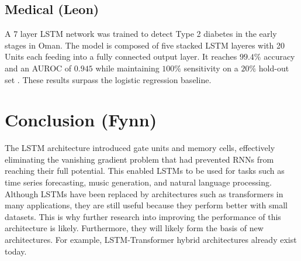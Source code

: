 \documentclass[twoside,a4paper,10pt,DIV=12,BCOR=12mm]{scrartcl}
\begin{document}
\subsection{Medical (Leon)}

A 7 layer LSTM network was trained to detect Type 2 diabetes in the early stages in Oman. The model is composed of five stacked
LSTM layeres with 20 Units each feeding into a fully connected output layer. It reaches \begin{math}99.4 \%\end{math} accuracy and an 
AUROC of \begin{math}0.945\end{math} while maintaining \begin{math}100 \%\end{math} sensitivity on a \begin{math}20 \%\end{math} hold-out set \cite{AlSadi2024LSTM}.
These results surpass the logistic regression baseline.


\section{Conclusion (Fynn)}
The LSTM architecture introduced gate units and memory cells, effectively eliminating the vanishing gradient problem that had prevented RNNs from reaching their full potential.\cite{hochreiter1997lstm} 
This enabled LSTMs to be used for tasks such as time series forecasting, music generation, and natural language processing.\cite{eck2002musicgeneration,nielsen2024electricitypriceforcasting,gers2001timeseries,torres2022elctricityforecasting,sak2014longshorttermmemorybased}\\
Although LSTMs have been replaced by architectures such as transformers in many applications, they are still useful because they perform better with small datasets. This is why further research into improving the performance of this architecture is likely.\cite{alselwi2024lstmfuture} Furthermore, they will likely form the basis of new architectures. For example, LSTM-Transformer hybrid architectures already exist today. \cite{zhao2025lstmtransformerhybrid} 


\end{document}
